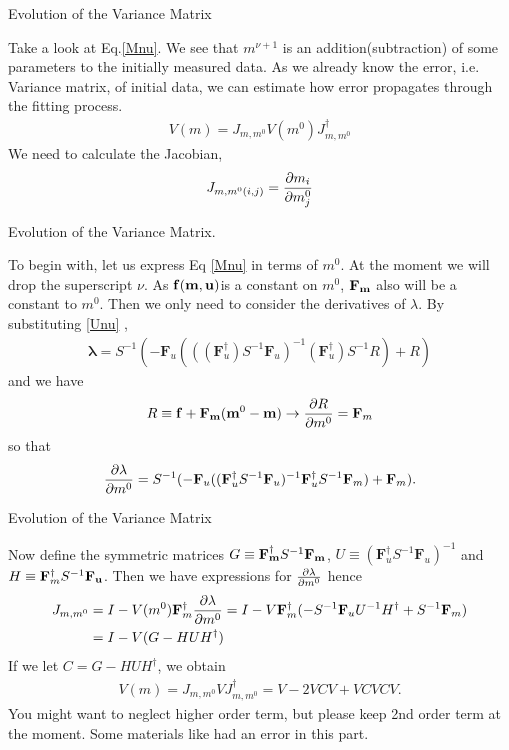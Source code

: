 \documentclass[
	xcolor=dvipsnames,
	10pt, 
	]{beamer}
\begin{document}
\begin{frame}{Evolution of the Variance Matrix}
	\begin{block}{}
		Take a look at Eq.\eqref{Mnu}. We see that $m^{\nu+1} $ is an addition(subtraction) of some parameters to the initially measured data. As we already know the error, i.e. Variance matrix, of initial data, we can estimate how error propagates through the fitting process. 
		\begin{align}
			V(m) = J_{m,m^0}V(m^0)J_{m,m^0}^\dagger
		\end{align}
		We need to calculate the Jacobian, 
		\begin{align}
			J_{m,m^0(i,j)} = \frac{\partial m_i}{\partial m^0_j}
		\end{align}
	\end{block}
\end{frame}
\begin{frame}{Evolution of the Variance Matrix.}
	\begin{block}{}
		To begin with, let us express Eq \eqref{Mnu} in terms of $m^0$. At the moment we will drop the superscript $\nu$. As $\mathbf{f}(\mathbf{m},\mathbf{u})$is a constant on $m^0$, $\mathbf{F}_{\mathbf{m}}$ also will be a constant to $m^0$. Then we only need to consider the derivatives of $\lambda$. By substituting \eqref{Unu} ,
		\begin{align}
	\mathbf\lambda = S^{-1}(-\mathbf F_u(((\mathbf{F}_u^\dagger) S^{-1}\mathbf F_u)^{-1}(\mathbf{F}_u^\dagger) S^{-1}R) + R)
		\end{align}
		and we have
		\begin{align}
			R\equiv \mathbf f + \mathbf{F}_\mathbf{m}(\mathbf{m}^0-\mathbf{m})\to \frac{\partial R}{\partial m^0}= \mathbf{F}_m
		\end{align} 
		so that 
		\begin{align}
			\frac{\partial \lambda}{\partial m^0}= S^{-1}(-\mathbf F_u((\mathbf{F}_u^\dagger S^{-1}\mathbf F_u)^{-1}\mathbf{F}_u^\dagger S^{-1}\mathbf{F}_m) + \mathbf{F}_m).
		\end{align}
	\end{block}
\end{frame}
\begin{frame}{Evolution of the Variance Matrix}
	\begin{block}{}
		Now define the symmetric matrices $G\equiv \mathbf{F_m^\dagger} S^{-1}\mathbf{F_m}$, $U\equiv (\mathbf{F}_u^\dagger S^{-1}\mathbf F_u)^{-1}$ and $H\equiv \mathbf{F}_m^\dagger S^{-1}\mathbf{F_u}$. Then we have expressions for $\frac{\partial \lambda}{\partial m^0}$ hence 
		\begin{align}
			J_{m,m^0}&=I - V(m^0)\mathbf{F}_m^\dagger\frac{\partial \lambda}{\partial m^0}=I - V\mathbf{F}^\dagger_m(-S^{-1}\mathbf{F}_u U^{-1}H^\dagger+S^{-1}\mathbf{F}_m)\nonumber\\
			&=I-V(G-HUH^\dagger)
		\end{align}
		If we let $C =G-HUH^\dagger$, we obtain
		\begin{align}
			V(m) = J_{m,m^0} VJ_{m,m^0}^\dagger =V -2 VCV  +VCVCV.\label{Vm}
		\end{align}
		You might want to neglect higher order term, but please keep 2nd order term at the moment. Some materials like \cite{Prob} had an error in this part.
	\end{block}
\end{frame}
\end{document}
